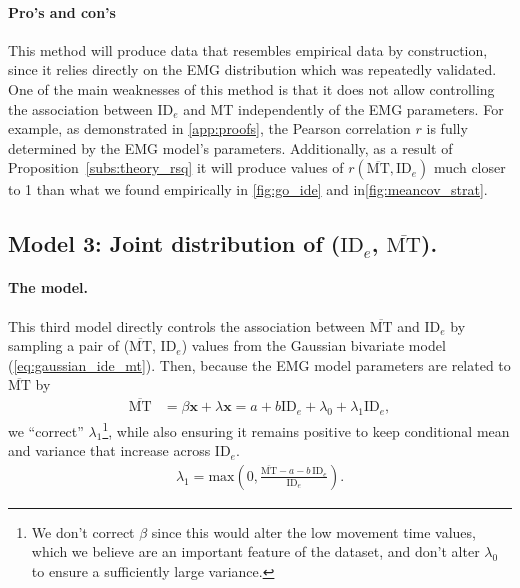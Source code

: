 \documentclass[acmlarge, manuscript,review]{acmart}
\newcommand{\mmt}{\ensuremath{\overline{\mt}}\xspace}
\newcommand{\mt}{\ensuremath{{\text{MT}}}\xspace}
\newcommand{\ide}{\ensuremath{{\text{ID}_e}}\xspace}
\begin{document}
\paragraph{Pro's and con's} This method will produce data that resembles empirical data by construction, since it relies directly on the EMG distribution which was repeatedly validated. One of the main weaknesses of this method is that it does not allow controlling the association between \ide and MT independently of the EMG parameters. For example, as demonstrated in \autoref{app:proofs}, the Pearson correlation $r$ is fully determined by the EMG model's parameters. Additionally, as a result of Proposition~\ref{subs:theory_rsq} it will produce values of $r(\mmt, \ide)$ much closer to 1 than what we found empirically in \autoref{fig:go_ide} and in\autoref{fig:meancov_strat}.

\subsection{Model 3: Joint distribution of (\ide, \mmt).}
\paragraph{The model.} This third model directly controls the association between \mmt and \ide by sampling a pair of (\mmt, \ide) values from the Gaussian bivariate model (\autoref{eq:gaussian_ide_mt}).
Then, because the EMG model parameters are related to \mmt by
\begin{align}
	\mmt & = \beta \mathbf{x} + \lambda \mathbf{x} = a + b \ide + \lambda_0 + \lambda_1 \ide,
\end{align}
we ``correct'' $\lambda_1$\footnote{We don't correct $\beta$ since this would alter the low movement time values, which we believe are an important feature of the dataset, and don't alter $\lambda_0$ to ensure a sufficiently large variance.}, while also ensuring it remains positive to keep conditional mean and variance that increase across \ide.
\begin{align}
	\lambda_1 = \text{max}(0, \frac{\mmt - a - b\,\ide}{\ide}). \label{eq:lambda_1}
\end{align}
\end{document}
